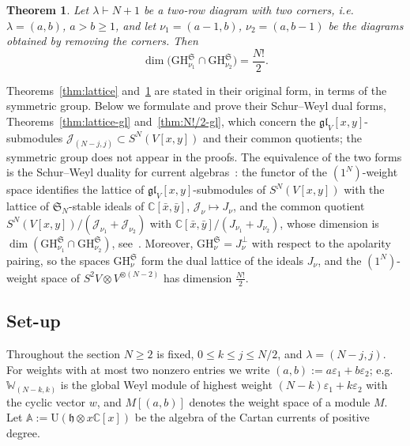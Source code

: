 \documentclass[11pt]{amsart}
\numberwithin{equation}{section}
\newtheorem{theorem}[equation]{Theorem}
\theoremstyle{definition}
\newcommand{\gl}{\mathfrak{gl}}
\newcommand{\fh}{\mathfrak{h}}
\newcommand{\U}{\mathrm{U}}
\newcommand{\bW}{\mathbb{W}}          %
\newcommand{\bA}{\mathbb{A}}          %
\newcommand{\GH}{\mathrm{GH}}         %
\newcommand{\eps}{\varepsilon}
\newcommand{\bx}{\bar{x}}
\newcommand{\by}{\bar{y}}
\newcommand{\cJ}{\mathcal{J}}
\newcommand{\sS}{\mathfrak{S}}
\begin{document}
	\begin{theorem}\label{thm:N!/2}
		Let $\lambda\vdash N+1$ be a two-row diagram with two corners, i.e.\ $\lambda=(a,b)$, $a>b\ge1$, and let $\nu_1=(a-1,b)$, $\nu_2=(a,b-1)$ be the diagrams obtained by removing the corners. Then
		\[
		\dim\big(\GH^{\mathfrak S}_{\nu_1}\cap\GH^{\mathfrak S}_{\nu_2}\big)=\frac{N!}2 .
		\]
	\end{theorem}
	
	Theorems~\ref{thm:lattice} and~\ref{thm:N!/2} are stated in their original form, in terms of the symmetric group. Below we formulate and prove their Schur--Weyl dual forms, Theorems~\ref{thm:lattice-gl} and~\ref{thm:N!/2-gl}, which concern the $\gl_V[x,y]$-submodules $\cJ_{(N-j,j)}\subset S^N(V[x,y])$ and their common quotients; the symmetric group does not appear in the proofs. The equivalence of the two forms is the Schur--Weyl duality for current algebras~\cite[\S3.3]{KM}: the functor of the $(1^N)$-weight space identifies the lattice of $\gl_V[x,y]$-submodules of $S^N(V[x,y])$ with the lattice of $\sS_N$-stable ideals of $\mathbb C[\bx,\by]$, $\cJ_\nu\mapsto J_\nu$, and the common quotient $S^N(V[x,y])/(\cJ_{\nu_1}+\cJ_{\nu_2})$ with $\mathbb C[\bx,\by]/(J_{\nu_1}+J_{\nu_2})$, whose dimension is $\dim(\GH^{\mathfrak S}_{\nu_1}\cap\GH^{\mathfrak S}_{\nu_2})$, see~\cite[Proposition~3.34]{KM}. Moreover, $\GH^{\mathfrak S}_\nu=J_\nu^\perp$ with respect to the apolarity pairing, so the spaces $\GH^{\mathfrak S}_\nu$ form the dual lattice of the ideals $J_\nu$, and the $(1^N)$-weight space of $S^2V\otimes V^{\otimes(N-2)}$ has dimension $\frac{N!}2$.
	
	\subsection{Set-up}\label{ssec:setup-new}
	
	Throughout the section $N\ge2$ is fixed, $0\le k\le j\le N/2$, and $\lambda=(N-j,j)$. For weights with at most two nonzero entries we write $(a,b):=a\eps_1+b\eps_2$; e.g.\ $\bW_{(N-k,k)}$ is the global Weyl module of highest weight $(N-k)\eps_1+k\eps_2$ with the cyclic vector $w$, and $M[(a,b)]$ denotes the weight space of a module $M$. Let $\bA:=\U(\fh\otimes x\mathbb C[x])$ be the algebra of the Cartan currents of positive degree.
	
\end{document}
